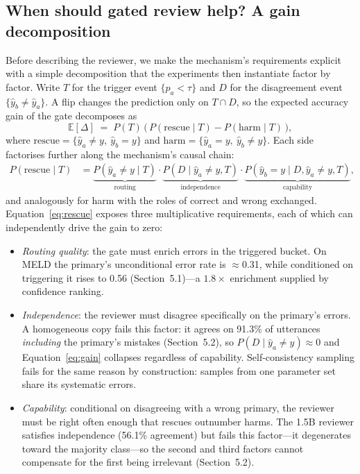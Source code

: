 \documentclass[final,5p,times,twocolumn]{elsarticle}
\begin{document}
\subsection{When should gated review help? A gain decomposition}
\label{sec:decomposition}
Before describing the reviewer, we make the mechanism's requirements
explicit with a simple decomposition that the experiments then instantiate
factor by factor. Write $T$ for the trigger event $\{p_a<\tau\}$ and
$D$ for the disagreement event $\{\hat y_b\neq\hat y_a\}$. A flip changes
the prediction only on $T\cap D$, so the expected accuracy gain of the gate
decomposes as
\begin{equation}
\label{eq:gain}
\mathbb{E}[\Delta] \;=\; P(T)\,\bigl(\,P(\text{rescue}\!\mid\! T) -
P(\text{harm}\!\mid\! T)\,\bigr),
\end{equation}
where $\text{rescue}=\{\hat y_a\neq y,\ \hat y_b = y\}$ and
$\text{harm}=\{\hat y_a = y,\ \hat y_b\neq y\}$. Each side factorises
further along the mechanism's causal chain:
\begin{align}
P(\text{rescue}\!\mid\! T) &= \underbrace{P(\hat y_a\neq y\!\mid\! T)}_{\text{routing}}
\cdot \underbrace{P(D\!\mid\! \hat y_a\neq y, T)}_{\text{independence}}
\cdot \underbrace{P(\hat y_b = y\!\mid\! D,\hat y_a\neq y,T)}_{\text{capability}},
\label{eq:rescue}
\end{align}
and analogously for harm with the roles of correct and wrong exchanged.
Equation~\eqref{eq:rescue} exposes three multiplicative requirements, each
of which can independently drive the gain to zero:

\begin{itemize}
  \item \emph{Routing quality}: the gate must enrich errors in the
  triggered bucket. On MELD the primary's unconditional error rate is
  $\approx$0.31, while conditioned on triggering it rises to 0.56
  (Section~5.1)---a $1.8\times$ enrichment supplied by confidence ranking.
  \item \emph{Independence}: the reviewer must disagree specifically on the
  primary's errors. A homogeneous copy fails this factor: it agrees on
  91.3\% of utterances \emph{including} the primary's mistakes
  (Section~5.2), so $P(D\mid \hat y_a\neq y)\approx0$ and
  Equation~\eqref{eq:gain} collapses regardless of capability.
  Self-consistency sampling fails for the same reason by construction:
  samples from one parameter set share its systematic errors.
  \item \emph{Capability}: conditional on disagreeing with a wrong primary,
  the reviewer must be right often enough that rescues outnumber harms. The
  1.5B reviewer satisfies independence (56.1\% agreement) but fails this
  factor---it degenerates toward the majority class---so the second and
  third factors cannot compensate for the first being irrelevant
  (Section~5.2).
\end{itemize}
\end{document}
